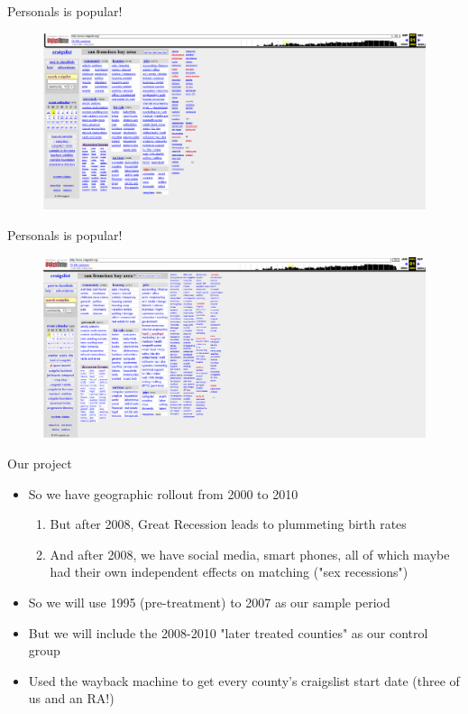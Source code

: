 \documentclass{beamer}
\begin{document}
\begin{frame}{Personals is popular!}
\begin{figure}
    \centering
    \includegraphics[height=0.85\textheight]{./lecture_includes/melanie7}
\end{figure}

\end{frame}

\begin{frame}{Personals is popular!}
\begin{figure}
    \centering
    \includegraphics[height=0.85\textheight]{./lecture_includes/melanie8}
\end{figure}

\end{frame}


\begin{frame}{Our project}

\begin{itemize}
\item So we have geographic rollout from 2000 to 2010
	\begin{enumerate}
\item But after 2008, Great Recession leads to plummeting birth rates
\item And after 2008, we have social media, smart phones, all of which maybe had their own independent effects on matching ("sex recessions")
	\end{enumerate}
\item So we will use 1995 (pre-treatment) to 2007 as our sample period
\item But we will include the 2008-2010 "later treated counties" as our control group
\item Used the wayback machine to get every county's craigslist start date (three of us and an RA!)
\end{itemize}

\end{frame}
\end{document}
